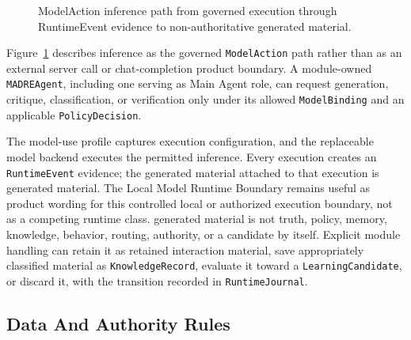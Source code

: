 \begin{figure}[H]
{%
	}
	\caption{ModelAction inference path from governed execution through RuntimeEvent evidence to non-authoritative generated material.}
	\label{fig:madre-model-invocation-action}
\end{figure}

Figure~\ref{fig:madre-model-invocation-action} describes inference as the governed \texttt{ModelAction} path rather than as an external server call or chat-completion product boundary. A module-owned \texttt{MADREAgent}, including one serving as Main Agent role, can request generation, critique, classification, or verification only under its allowed \texttt{ModelBinding} and an applicable \texttt{PolicyDecision}.

The model-use profile captures execution configuration, and the replaceable model backend executes the permitted inference. Every execution creates an \texttt{RuntimeEvent} evidence; the generated material attached to that execution is generated material. The Local Model Runtime Boundary remains useful as product wording for this controlled local or authorized execution boundary, not as a competing runtime class. generated material is not truth, policy, memory, knowledge, behavior, routing, authority, or a candidate by itself. Explicit module handling can retain it as retained interaction material, save appropriately classified material as \texttt{KnowledgeRecord}, evaluate it toward a \texttt{LearningCandidate}, or discard it, with the transition recorded in \texttt{RuntimeJournal}.
\subsection{Data And Authority Rules}


